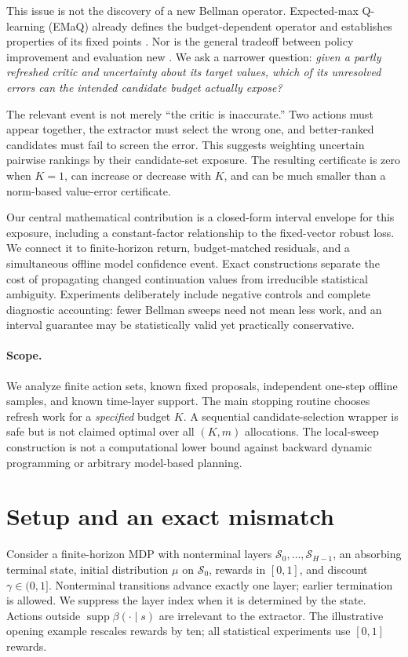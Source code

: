 \documentclass[11pt]{article}
\newcommand{\supp}{\operatorname{supp}}\newcommand{\cT}{\mathcal T}
\begin{document}
This issue is not the discovery of a new Bellman operator. Expected-max Q-learning (EMaQ) already defines the budget-dependent operator and establishes properties of its fixed points \citep{ghasemipour2021emaq}. Nor is the general tradeoff between policy improvement and evaluation new \citep{scherrer2015ampi}. We ask a narrower question: \emph{given a partly refreshed critic and uncertainty about its target values, which of its unresolved errors can the intended candidate budget actually expose?}

The relevant event is not merely ``the critic is inaccurate.'' Two actions must appear together, the extractor must select the wrong one, and better-ranked candidates must fail to screen the error. This suggests weighting uncertain pairwise rankings by their candidate-set exposure. The resulting certificate is zero when $K=1$, can increase or decrease with $K$, and can be much smaller than a norm-based value-error certificate.

Our central mathematical contribution is a closed-form interval envelope for this exposure, including a constant-factor relationship to the fixed-vector robust loss. We connect it to finite-horizon return, budget-matched residuals, and a simultaneous offline model confidence event. Exact constructions separate the cost of propagating changed continuation values from irreducible statistical ambiguity. Experiments deliberately include negative controls and complete diagnostic accounting: fewer Bellman sweeps need not mean less work, and an interval guarantee may be statistically valid yet practically conservative.

\paragraph{Scope.} We analyze finite action sets, known fixed proposals, independent one-step offline samples, and known time-layer support. The main stopping routine chooses refresh work for a \emph{specified} budget $K$. A sequential candidate-selection wrapper is safe but is not claimed optimal over all $(K,m)$ allocations. The local-sweep construction is not a computational lower bound against backward dynamic programming or arbitrary model-based planning.

\section{Setup and an exact mismatch}
Consider a finite-horizon MDP with nonterminal layers $\mathcal S_0,\ldots,\mathcal S_{H-1}$, an absorbing terminal state, initial distribution $\mu$ on $\mathcal S_0$, rewards in $[0,1]$, and discount $\gamma\in(0,1]$. Nonterminal transitions advance exactly one layer; earlier termination is allowed. We suppress the layer index when it is determined by the state. Actions outside $\supp\beta(\cdot\mid s)$ are irrelevant to the extractor. The illustrative opening example rescales rewards by ten; all statistical experiments use $[0,1]$ rewards.
\end{document}
